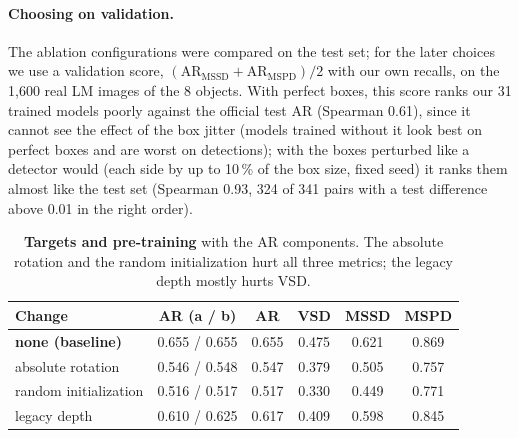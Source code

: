 \paragraph{Choosing on validation.}
The ablation configurations were compared on the test set; for the later choices we use a
validation score, $(\mathrm{AR}_\mathrm{MSSD} + \mathrm{AR}_\mathrm{MSPD})/2$ with our own recalls,
on the 1,600 real LM images of the 8 objects. With perfect boxes, this score ranks our 31 trained
models poorly against the official test AR (Spearman 0.61), since it cannot see the effect of the
box jitter (models trained without it look best on perfect boxes and are worst on detections);
with the boxes perturbed like a detector would (each side by up to 10\,\% of the box size, fixed
seed) it ranks them almost like the test set (Spearman 0.93, 324 of 341 pairs with a test
difference above 0.01 in the right order).

\begin{table}[h]
  \centering
  \setlength{\tabcolsep}{3.5pt}
  \footnotesize
  \begin{tabular}{lccccc}
    \toprule
    Change & AR (a / b) & AR & VSD & MSSD & MSPD \\
    \midrule
    \textbf{none (baseline)} & 0.655 / 0.655 & 0.655 & 0.475 & 0.621 & 0.869 \\
    absolute rotation & 0.546 / 0.548 & 0.547 & 0.379 & 0.505 & 0.757 \\
    random initialization & 0.516 / 0.517 & 0.517 & 0.330 & 0.449 & 0.771 \\
    legacy depth & 0.610 / 0.625 & 0.617 & 0.409 & 0.598 & 0.845 \\
    \bottomrule
  \end{tabular}
  \caption{\textbf{Targets and pre-training} with the AR components. The absolute rotation and
  the random initialization hurt all three metrics; the legacy depth mostly hurts VSD.}
  \label{tab:supp:targets}
\end{table}

